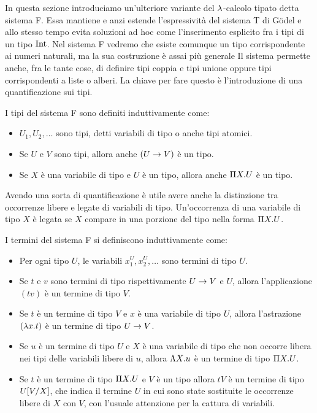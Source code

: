 \documentclass[]{marticle}
\begin{document}
In questa sezione introduciamo un'ulteriore variante del $\l$-calcolo tipato
detta sistema F. Essa mantiene e anzi estende l'espressivit\`a del sistema T di
G\"odel e allo stesso tempo evita soluzioni ad hoc come l'inserimento esplicito
fra i tipi di un tipo $\tint$. Nel sistema F vedremo che esiste comunque un tipo
corrispondente ai numeri naturali, ma la sua costruzione \`e assai pi\`u
generale Il sistema permette anche, fra le tante cose, di definire tipi coppia e
tipi unione oppure tipi corrispondenti a liste o alberi. La chiave per fare
questo \`e l'introduzione di una quantificazione sui tipi.

\begin{block}[Definizione]
    I tipi del sistema F sono definiti induttivamente come:
    \begin{itemize}
        \item $U_1, U_2, \dots$ sono tipi, detti variabili di tipo o anche tipi
            atomici.
        \item Se $U$ e $V$ sono tipi, allora anche $(U\rar V)$ \`e un tipo.
        \item Se $X$ \`e una variabile di tipo e $U$ \`e un tipo, allora anche
            $\P X. U$ \`e un tipo.
    \end{itemize}
\end{block}

Avendo una sorta di quantificazione \`e utile avere anche la distinzione tra
occorrenze libere e legate di variabili di tipo. Un'occorrenza di una variabile
di tipo $X$ \`e legata se $X$ compare in una porzione del tipo nella forma $\P
X. U$.

\begin{block}[Definizione]
    I termini del sistema F si definiscono induttivamente come:
    \begin{itemize}
        \item Per ogni tipo $U$, le variabili $x^U_1, x^U_2, \dots$ sono termini
            di tipo $U$.
        \item Se $t$ e $v$ sono termini di tipo rispettivamente $U\rar V$ e $U$,
            allora l'applicazione $(tv)$ \`e un termine di tipo $V$.
        \item Se $t$ \`e un termine di tipo $V$ e $x$ \`e una variabile di tipo
            $U$, allora l'astrazione $(\l x.  t)$ \`e un termine di tipo $U\rar
            V$.
        \item Se $u$ \`e un termine di tipo $U$ e $X$ \`e una variabile di tipo
            che non occorre libera nei tipi delle variabili libere di $u$,
            allora $\L X. u$ \`e un termine di tipo $\P X.U$. 
        \item Se $t$ \`e un termine di tipo $\P X. U$ e $V$ \`e un tipo allora
            $tV$ \`e un termine di tipo $U\sub{V}{X}$, che indica il termine $U$
            in cui sono state sostituite le occorrenze libere di $X$ con $V$,
            con l'usuale attenzione per la cattura di variabili.
    \end{itemize}
\end{block}
\end{document}
